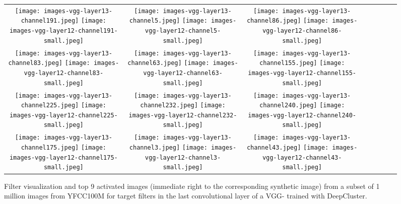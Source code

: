 \documentclass[runningheads]{llncs}
\def\OURS{DeepCluster\xspace}
\begin{document}
\begin{figure}[t]
\centering
\begin{tabular}{cccccccc}
\texttt{[image: images-vgg-layer13-channel191.jpeg]}
\texttt{[image: images-vgg-layer12-channel191-small.jpeg]}&
\texttt{[image: images-vgg-layer13-channel5.jpeg]}
\texttt{[image: images-vgg-layer12-channel5-small.jpeg]}&
\texttt{[image: images-vgg-layer13-channel86.jpeg]}
\texttt{[image: images-vgg-layer12-channel86-small.jpeg]}&
\\
\texttt{[image: images-vgg-layer13-channel83.jpeg]}
\texttt{[image: images-vgg-layer12-channel83-small.jpeg]}&
\texttt{[image: images-vgg-layer13-channel63.jpeg]}
\texttt{[image: images-vgg-layer12-channel63-small.jpeg]}&
\texttt{[image: images-vgg-layer13-channel155.jpeg]}
\texttt{[image: images-vgg-layer12-channel155-small.jpeg]}&
\\
\texttt{[image: images-vgg-layer13-channel225.jpeg]}
\texttt{[image: images-vgg-layer12-channel225-small.jpeg]}&
\texttt{[image: images-vgg-layer13-channel232.jpeg]}
\texttt{[image: images-vgg-layer12-channel232-small.jpeg]}&
\texttt{[image: images-vgg-layer13-channel240.jpeg]}
\texttt{[image: images-vgg-layer12-channel240-small.jpeg]}&
\\
\texttt{[image: images-vgg-layer13-channel175.jpeg]}
\texttt{[image: images-vgg-layer12-channel175-small.jpeg]}&
\texttt{[image: images-vgg-layer13-channel3.jpeg]}
\texttt{[image: images-vgg-layer12-channel3-small.jpeg]}&
\texttt{[image: images-vgg-layer13-channel43.jpeg]}
\texttt{[image: images-vgg-layer12-channel43-small.jpeg]}&

\end{tabular}
\caption{
Filter visualization and top 9 activated images (immediate right to the corresponding synthetic image) from a subset of 1 million images from YFCC100M for target filters in the last convolutional layer of a VGG- trained with \OURS.}
\label{fig:vgg}
\end{figure}
\end{document}
